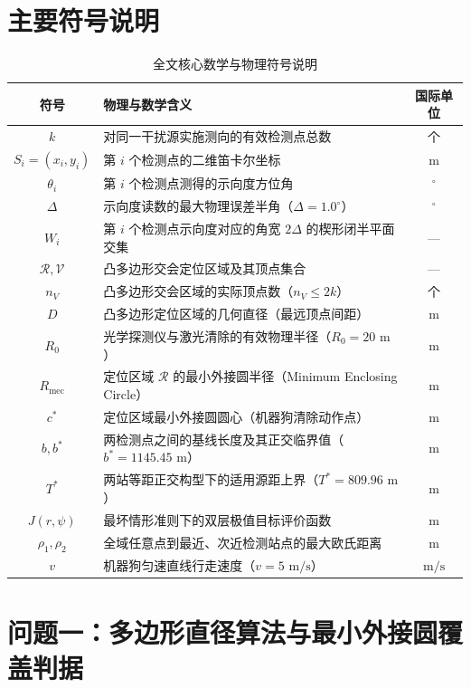 \documentclass[12pt,a4paper,UTF8]{ctexart}
\begin{document}
\section{主要符号说明}
\begin{table}[htbp]
\centering
\caption{全文核心数学与物理符号说明}
\begin{tabular}{clc}
\toprule
\textbf{符号} & \textbf{物理与数学含义} & \textbf{国际单位} \\
\midrule
$k$ & 对同一干扰源实施测向的有效检测点总数 & 个 \\
$S_i = (x_i, y_i)$ & 第 $i$ 个检测点的二维笛卡尔坐标 & $\text{m}$ \\
$\theta_i$ & 第 $i$ 个检测点测得的示向度方位角 & $^\circ$ \\
$\Delta$ & 示向度读数的最大物理误差半角（$\Delta = 1.0^\circ$） & $^\circ$ \\
$W_i$ & 第 $i$ 个检测点示向度对应的角宽 $2\Delta$ 的楔形闭半平面交集 & — \\
$\mathcal{R}, \mathcal{V}$ & 凸多边形交会定位区域及其顶点集合 & — \\
$n_V$ & 凸多边形交会区域的实际顶点数（$n_V \le 2k$） & 个 \\
$D$ & 凸多边形定位区域的几何直径（最远顶点间距） & $\text{m}$ \\
$R_0$ & 光学探测仪与激光清除的有效物理半径（$R_0 = 20\text{ m}$） & $\text{m}$ \\
$R_{\text{mec}}$ & 定位区域 $\mathcal{R}$ 的最小外接圆半径（Minimum Enclosing Circle） & $\text{m}$ \\
$c^*$ & 定位区域最小外接圆圆心（机器狗清除动作点） & $\text{m}$ \\
$b, b^*$ & 两检测点之间的基线长度及其正交临界值（$b^* = 1145.45\text{ m}$） & $\text{m}$ \\
$T^*$ & 两站等距正交构型下的适用源距上界（$T^* = 809.96\text{ m}$） & $\text{m}$ \\
$J(r, \psi)$ & 最坏情形准则下的双层极值目标评价函数 & $\text{m}$ \\
$\rho_1, \rho_2$ & 全域任意点到最近、次近检测站点的最大欧氏距离 & $\text{m}$ \\
$v$ & 机器狗匀速直线行走速度（$v = 5\text{ m/s}$） & $\text{m/s}$ \\
\bottomrule
\end{tabular}
\end{table}

\section{问题一：多边形直径算法与最小外接圆覆盖判据}
\end{document}
